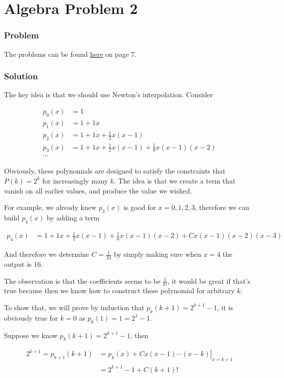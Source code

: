 \section*{Algebra Problem 2}
\subsubsection*{Problem}
The problems can be found \href{https://www.math.hkust.edu.hk/~makyli/190_2010Sp/problemBk.pdf}{here} on page 7.

\subsubsection*{Solution}
The key idea is that we should use Newton's interpolation. Consider 

\begin{align*}
  p_0(x) &= 1 \\
  p_1(x) &= 1 + 1x \\
  p_2(x) &= 1 + 1x + \frac{1}{2}x(x-1) \\
  p_3(x) &= 1 + 1x + \frac{1}{2}x(x-1) + \frac{1}{6}x(x-1)(x-2)\\
  \cdots
\end{align*}

Obviously, these polynomials are designed to satisfy the constraints that $ P(k) = 2^k $ for increasingly many $ k $. The idea is that we create a term that vanish on all earlier values, and produce the value we wished.

For example, we already knew $ p_3(x) $ is good for $ x = 0, 1, 2, 3 $, therefore we can build $ p_4(x) $ by adding a term 

\begin{align*}
  p_4(x) &= 1 + 1x + \frac{1}{2}x(x-1) + \frac{1}{6}x(x-1)(x-2) + Cx(x-1)(x-2)(x-3)
\end{align*}

And therefore we determine $ C = \frac{1}{24} $ by simply making sure when $ x = 4 $ the output is 16. 

The observation is that the coefficients seems to be $ \frac{1}{k!} $, it would be great if that's true because then we know how to construct these polynomial for arbitrary $ k $.

To show that, we will prove by induction that $ p_k(k+1) = 2^{k + 1} - 1 $, it is obviously true for $ k = 0 $ as $ p_0(1) = 1 = 2^{1} - 1 $.

Suppose we know $ p_k(k+1) = 2^{k + 1} - 1 $, then

\begin{align*}
  2^{k+1} = p_{k+1}(k+1) &= \left. p_k(x) + Cx(x-1)\cdots(x - k) \right|_{x=k+1} \\
                         &= 2^{k + 1} - 1 + C (k + 1)!
\end{align*}

